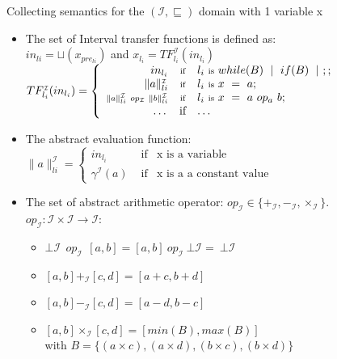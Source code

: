 \begin{frame}{Collecting semantics for the $(\mathcal{I},\sqsubseteq)$  domain with 1 variable x}
\begin{itemize}
	\item \scriptsize The set of Interval transfer functions is defined as: \\$in_{li}=\sqcup(x_{pre_{li}})$ and $ x_{l_i}= TF^{\scriptscriptstyle \mathcal{I}}_{l_i}(in_{l_i})$\\
	$  TF^{\scriptscriptstyle \mathcal{I}}_{l_i}(in_{l_i}) =     \left\{ \begin{array}{rcl}
	\textstyle	in_{l_i} &  \mbox{\scriptsize if}& \textstyle l_i~\text{\scriptsize is}~while(B)~\mid~ if(B) ~\mid~;;   \\
	\textstyle	\|a\|_{li}^{\scriptscriptstyle \mathcal{I}}  & \mbox{\scriptsize if} & \textstyle l_i~\mbox{\scriptsize is}~x~=~a; \\
	\scriptstyle	\|a\|_{li}^{\scriptscriptstyle \mathcal{I}}~op_\mathcal{I}~ \|b\|_{li}^{\scriptscriptstyle \mathcal{I}}  & \mbox{\scriptsize if} &  \textstyle l_i~\mbox{\scriptsize is}~x~=~a~op_a~b; \\
	\dots & \mbox{if} & \dots
	\end{array}\right.$
	
	\item \scriptsize The abstract evaluation function:\\  $ \|a\|_{li}^ {\scriptscriptstyle \mathcal{I}} =     \left\{ \begin{array}{rcl}
	in_{l_i} & \mbox{ if}&  \text{x is a variable}   \\
	\gamma^{\scriptscriptstyle \mathcal{I}}(a)  & \mbox{ if} &  \text{x is a a constant value} 
	\end{array}\right.$
		\item The set of abstract arithmetic operator:
		 $op_{\scriptscriptstyle \mathcal{I}}\in \{+_{\scriptscriptstyle \mathcal{I}}, -_{\scriptscriptstyle \mathcal{I}}, \times_{\scriptscriptstyle \mathcal{I}}\}$.\\
		 $op_{\scriptscriptstyle \mathcal{I}}: \mathcal{I} \times \mathcal{I} \rightarrow \mathcal{I}:$
		 
		 
		\begin{itemize}
		 	\item $\bot{\scriptscriptstyle \mathcal{I}} ~~op_{\scriptscriptstyle \mathcal{I}}~~ [a,b] = [a,b]~ op_{\scriptscriptstyle \mathcal{I}} ~\bot{\scriptscriptstyle \mathcal{I}} = ~\bot{\scriptscriptstyle \mathcal{I}}  $
		 	\item $[a,b] +_{\scriptscriptstyle \mathcal{I}}[c,d] = [a+c,b+d]$
		 	\item $[a,b] -_{\scriptscriptstyle \mathcal{I}}[c,d] = [a-d,b-c]$
		 	\item $ [a,b] \times_{\scriptscriptstyle \mathcal{I}}[c,d]=[min(B), max(B)] $\\ with $ B = \{(a \times c), (a \times d), (b\times c), (b \times d)\}$
		 \end{itemize}
		 
\end{itemize}
\end{frame}

